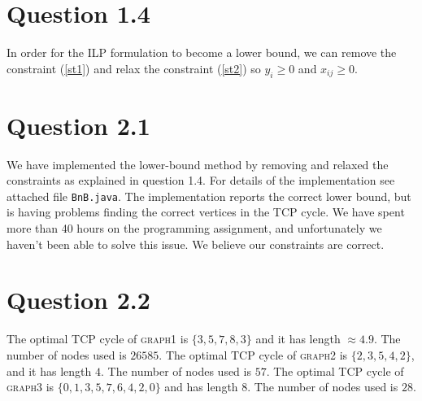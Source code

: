 \documentclass[10pt]{article}
\begin{document}

\section*{Question 1.4} %
\label{sec:question_1_4}
In order for the ILP formulation to become a lower bound, we can remove the constraint (\ref{st1}) and relax the constraint (\ref{st2}) so $y_i \geq 0$ and $x_{ij} \geq 0$.

\section*{Question 2.1} %
\label{sec:question_2_1}
We have implemented the lower-bound method by removing and relaxed the constraints as explained in question 1.4. For details of the implementation see attached file \texttt{BnB.java}. The implementation reports the correct lower bound, but is having problems finding the correct vertices in the TCP cycle. We have spent more than 40 hours on the programming assignment, and unfortunately we haven't been able to solve this issue. We believe our constraints are correct.

\section*{Question 2.2} %
\label{sec:question_2_2}
The optimal TCP cycle of \textsc{graph1} is $\{3,5,7,8,3\}$ and it has length $\approx 4.9$. The number of nodes used is $26585$. The optimal TCP cycle of \textsc{graph2} is $\{2,3,5,4,2\}$, and it has length $4$. The number of nodes used is $57$. The optimal TCP cycle of \textsc{graph3} is $\{0,1,3,5,7,6,4,2,0\}$ and has length $8$. The number of nodes used is $28$.



%
%
\end{document}
